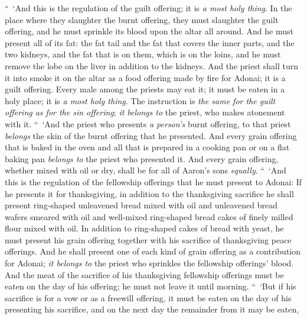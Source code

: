 \begin{biblechapter} %
 “ ‘And this is the regulation of the guilt offering; it is \textit{a most holy thing}.
\verse In the place where they slaughter the burnt offering, they must slaughter the guilt offering, and he must sprinkle its blood upon the altar all around.
\verse And he must present all of its fat: the fat tail and the fat that covers the inner parts,
\verse and the two kidneys, and the fat that is on them, which is on the loins, and he must remove the lobe on the liver in addition to the kidneys.
\verse And the priest shall turn it into smoke it on the altar as a food offering made by fire for Adonai; it is a guilt offering.
\verse Every male among the priests may eat it; it must be eaten in a holy place; it is \textit{a most holy thing}.
\verse The instruction is \textit{the same for the guilt offering as for the sin offering}; \textit{it belongs to} the priest, who makes atonement with it.
 “ ‘And the priest who presents \textit{a person’s} burnt offering, to that priest \textit{belongs} the skin of the burnt offering that he presented.
\verse And every grain offering that is baked in the oven and all that is prepared in a cooking pan or on a flat baking pan \textit{belongs to} the priest who presented it.
\verse And every grain offering, whether mixed with oil or dry, shall be for all of Aaron’s sons \textit{equally}.
 “ ‘And this is the regulation of the fellowship offerings that he must present to Adonai:
\verse If he presents it for thanksgiving, in addition to the thanksgiving sacrifice he shall present ring-shaped unleavened bread mixed with oil and unleavened bread wafers smeared with oil and well-mixed ring-shaped bread cakes of finely milled flour mixed with oil.
\verse In addition to ring-shaped cakes of bread with yeast, he must present his grain offering together with his sacrifice of thanksgiving peace offerings.
\verse And he shall present one of each kind of grain offering as a contribution for Adonai; \textit{it belongs to} the priest who sprinkles the fellowship offerings’ blood.
\verse And the meat of the sacrifice of his thanksgiving fellowship offerings must be eaten on the day of his offering; he must not leave it until morning.
\verse “ ‘But if his sacrifice is for a vow or as a freewill offering, it must be eaten on the day of his presenting his sacrifice, and on the next day the remainder from it may be eaten,

\end{biblechapter}
